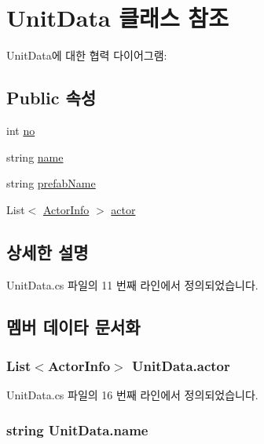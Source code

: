 \hypertarget{class_unit_data}{}\section{Unit\+Data 클래스 참조}
\label{class_unit_data}


Unit\+Data에 대한 협력 다이어그램\+:
\subsection*{Public 속성}
\begin{DoxyCompactItemize}
\item 
int \hyperlink{class_unit_data_a45de9d7b5ceb45a81feca29b67e1c46c}{no}
\item 
string \hyperlink{class_unit_data_a7aa329703ed47d3d717cbe3343133ad8}{name}
\item 
string \hyperlink{class_unit_data_a1523fa01f295711683596fec6f3268e5}{prefab\+Name}
\item 
List$<$ \hyperlink{class_actor_info}{Actor\+Info} $>$ \hyperlink{class_unit_data_ad1e372fd4cb1548a947582f993eab2b7}{actor}
\end{DoxyCompactItemize}


\subsection{상세한 설명}


Unit\+Data.\+cs 파일의 11 번째 라인에서 정의되었습니다.



\subsection{멤버 데이타 문서화}
\subsubsection[{\texorpdfstring{actor}{actor}}]{\setlength{\rightskip}{0pt plus 5cm}List$<${\bf Actor\+Info}$>$ Unit\+Data.\+actor}\hypertarget{class_unit_data_ad1e372fd4cb1548a947582f993eab2b7}{}\label{class_unit_data_ad1e372fd4cb1548a947582f993eab2b7}


Unit\+Data.\+cs 파일의 16 번째 라인에서 정의되었습니다.

\subsubsection[{\texorpdfstring{name}{name}}]{\setlength{\rightskip}{0pt plus 5cm}string Unit\+Data.\+name}\hypertarget{class_unit_data_a7aa329703ed47d3d717cbe3343133ad8}{}\label{class_unit_data_a7aa329703ed47d3d717cbe3343133ad8}


